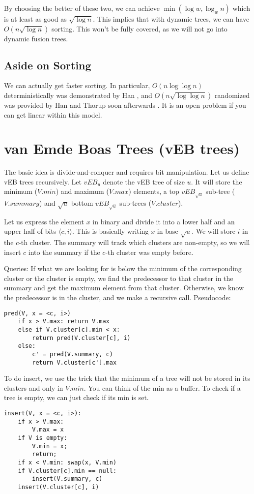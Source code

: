 \documentclass[11pt]{article}
\begin{document}
By choosing the better of these two, we can achieve $\min(\log{w}, \log_w{n})$ which is at least as good as $\sqrt{\log{n}}$. This implies that with dynamic trees, we can have $O(n \sqrt{\log{n}})$ sorting. This won't be fully covered, as we will not go into dynamic fusion trees.

\subsection{Aside on Sorting}
We can actually get faster sorting. In particular, $O(n \log \log{n})$ deterministically was demonstrated by Han \cite{Han02}, and $O(n \sqrt{\log \log{n}})$ randomized was provided by Han and Thorup soon afterwards \cite{HanThorup02}. It is an open problem if you can get linear within this model.

\section{van Emde Boas Trees (vEB trees)}

The basic idea is divide-and-conquer and requires bit manipulation. Let us define vEB trees recursively. Let $vEB_u$ denote the vEB tree of size $u$. It will store the
minimum ($V.min$) and maximum ($V.max$) elements, a top $vEB_{\sqrt{u}}$ sub-tree ($V.summary$) and $\sqrt{u}$ bottom $vEB_{\sqrt{u}}$ sub-trees ($V.cluster$).

Let us express the element $x$ in binary and divide it into a lower half and an upper half of bits $\langle c, i \rangle$. This is basically writing $x$ in base $\sqrt{u}$. We will store $i$ in the $c$-th cluster. The summary will track which clusters are non-empty, so we will insert $c$ into the summary if the $c$-th cluster was empty before.

Queries: If what we are looking for is below the minimum of the corresponding cluster or the cluster is empty, we find the predecessor to that cluster in the summary and get the maximum element from that cluster. Otherwise, we know the predecessor is in the cluster, and we make a recursive call. 
Pseudocode:
\begin{verbatim}
pred(V, x = <c, i>)
    if x > V.max: return V.max
    else if V.cluster[c].min < x:
        return pred(V.cluster[c], i)
    else:
        c' = pred(V.summary, c)
        return V.cluster[c'].max
\end{verbatim}

To do insert, we use the trick that the minimum of a tree will not be stored in its clusters and only in $V.min$. You can think of the min as a buffer. To check if a tree is empty, we can just check if its min is set.
\begin{verbatim}
insert(V, x = <c, i>):
    if x > V.max:
        V.max = x
    if V is empty:
        V.min = x; 
        return;
    if x < V.min: swap(x, V.min)
    if V.cluster[c].min == null:
        insert(V.summary, c)
    insert(V.cluster[c], i)
\end{verbatim}
\end{document}
